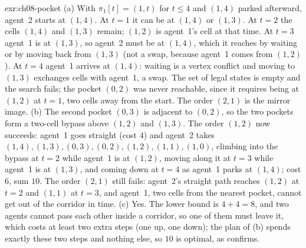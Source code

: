 \begin{solution}{exr:ch08-pocket}
(a) With $\pi_1[t] = (1,t)$ for $t \le 4$ and $(1,4)$ parked afterward, agent~2 starts at $(1,4)$. At $t = 1$ it can be at $(1,4)$ or $(1,3)$. At $t = 2$ the cells $(1,4)$ and $(1,3)$ remain; $(1,2)$ is agent~1's cell at that time. At $t = 3$ agent~1 is at $(1,3)$, so agent~2 must be at $(1,4)$, which it reaches by waiting or by moving back from $(1,3)$ (not a swap, because agent~1 comes from $(1,2)$). At $t = 4$ agent~1 arrives at $(1,4)$: waiting is a vertex conflict and moving to $(1,3)$ exchanges cells with agent~1, a swap. The set of legal states is empty and the search fails; the pocket $(0,2)$ was never reachable, since it requires being at $(1,2)$ at $t = 1$, two cells away from the start. The order $(2,1)$ is the mirror image. (b) The second pocket $(0,3)$ is adjacent to $(0,2)$, so the two pockets form a two-cell bypass above $(1,2)$ and $(1,3)$. The order $(1,2)$ now succeeds: agent~1 goes straight (cost $4$) and agent~2 takes $(1,4), (1,3), (0,3), (0,2), (1,2), (1,1), (1,0)$, climbing into the bypass at $t = 2$ while agent~1 is at $(1,2)$, moving along it at $t = 3$ while agent~1 is at $(1,3)$, and coming down at $t = 4$ as agent~1 parks at $(1,4)$; cost $6$, sum $10$. The order $(2,1)$ still fails: agent~2's straight path reaches $(1,2)$ at $t = 2$ and $(1,1)$ at $t = 3$, and agent~1, two cells from the nearest pocket, cannot get out of the corridor in time. (c) Yes. The lower bound is $4 + 4 = 8$, and two agents cannot pass each other inside a corridor, so one of them must leave it, which costs at least two extra steps (one up, one down); the plan of (b) spends exactly these two steps and nothing else, so $10$ is optimal, as  confirms.
\end{solution}

